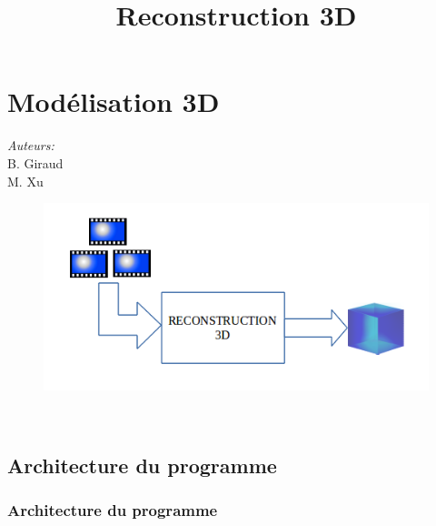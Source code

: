 
 \section{Modélisation 3D}
 \begin{frame}
 \title{Reconstruction 3D}
 \titlepage

    \begin{minipage}{0.3\textwidth}
    \begin{flushleft} \large
    \emph{Auteurs:}\\
    B. Giraud\\
    M. Xu
    \end{flushleft}
    \end{minipage}
    \begin{minipage}{0.5\textwidth}
    \begin{flushright} \large
    \begin{figure}
    \includegraphics[width=1.4\textwidth]{Fig/architectureSectionReco3d.png}
    \end{figure}
    \end{flushright}
    \end{minipage}\\[3cm]
    
 \end{frame} 
 
\subsection{Architecture du programme}
\begin{frame}
  \frametitle{Architecture du programme}

\end{frame}	  
	  
